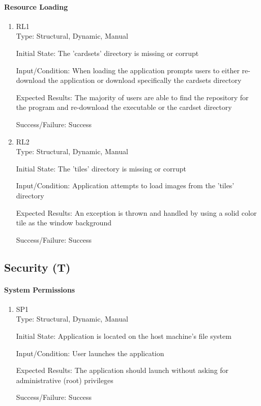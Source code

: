 \documentclass[12pt, titlepage]{article}
\newcounter{tnum}
\newcommand{\tthetnum}{T\thetnum}
\begin{document}
	\paragraph{Resource Loading}
	\begin{enumerate}
		\item{RL1\\}
		Type: Structural, Dynamic, Manual
		
		Initial State: The 'cardsets' directory is missing or corrupt
		
		Input/Condition: When loading the application prompts users to either
		re-download the application or download specifically the cardsets directory
		
		Expected Results: The majority of users are able to find the repository for the
		program and re-download the executable or the cardset directory

		Success/Failure: Success
		
		\item{RL2\\}
		Type: Structural, Dynamic, Manual
		
		Initial State: The 'tiles' directory is missing or corrupt
		
		Input/Condition: Application attempts to load images from the 'tiles' directory
		
		Expected Results: An exception is thrown and handled by using a solid color tile
		as the window background

		Success/Failure: Success
	\end{enumerate}
	
	 \label{tSec}
	\subsection{Security (\tthetnum)}
	\paragraph{System Permissions}
	\begin{enumerate}
		\item{SP1\\}
		Type: Structural, Dynamic, Manual
		
		Initial State: Application is located on the host machine's file system
		
		Input/Condition: User launches the application
		
		Expected Results: The application should launch without asking for administrative
		(root) privileges

		Success/Failure: Success
	\end{enumerate}
\end{document}
